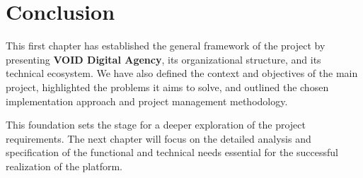 \section{Conclusion}
\noindent
This first chapter has established the general framework of the project by presenting \textbf{VOID Digital Agency}, its organizational structure, and its technical ecosystem.  
We have also defined the context and objectives of the main project, highlighted the problems it aims to solve, and outlined the chosen implementation approach and project management methodology.

\medskip

\noindent
This foundation sets the stage for a deeper exploration of the project requirements.  
The next chapter will focus on the detailed analysis and specification of the functional and technical needs essential for the successful realization of the platform.
